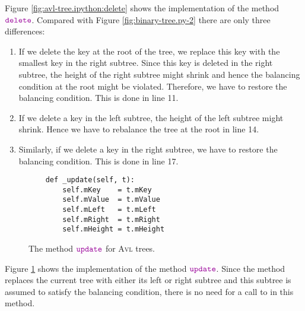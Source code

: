 Figure \ref{fig:avl-tree.ipython:delete} shows the implementation of the method $\mytt{delete}$.
Compared with Figure
\ref{fig:binary-tree.py-2} there are only three differences:
\begin{enumerate}
\item If we delete the key at the root of the tree, we replace this key with the smallest key in the
      right subtree. Since this key is deleted in the right subtree, the height of the right
      subtree might shrink and hence the balancing condition at the root might be violated.
      Therefore, we have to restore the balancing condition.  This is done in line 11.
\item If we delete a key in the left subtree, the height of the left subtree might shrink.
      Hence we have to rebalance the tree at the root in line 14.
\item Similarly, if we delete a key in the right subtree, we have to restore the balancing
      condition.  This is done in line 17.
\end{enumerate}
\FloatBarrier
\pagebreak

\begin{figure}[!ht]
\centering
\begin{verbatim}
    def _update(self, t):
        self.mKey    = t.mKey
        self.mValue  = t.mValue
        self.mLeft   = t.mLeft
        self.mRight  = t.mRight
        self.mHeight = t.mHeight            
\end{verbatim}
\vspace*{-0.3cm}
\caption{The method $\mytt{update}$ for \textsc{Avl} trees.}
\label{fig:avl-tree.ipython:update}
\end{figure}

Figure \ref{fig:avl-tree.ipython:update} shows the implementation of the method $\mytt{update}$.
Since the method  replaces the current tree with either its left or right subtree and this
subtree is assumed to satisfy the balancing condition, there is no need for a call to  in this
method. 
\FloatBarrier

